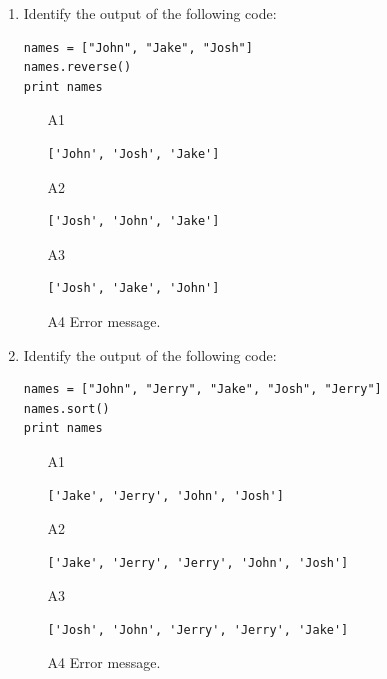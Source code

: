 \begin{enumerate}
\begin{enumerate}
\begin{verbatim}
['Jenny', 'John', 'Jake', 'Josh']
\end{verbatim}
\item[A2] 
\begin{verbatim}
['John', 'Jenny', 'Jake', 'Josh']
\end{verbatim}
\item[A3] 
\begin{verbatim}
['Jenny', 'Jake', 'Josh']
\end{verbatim}
\item[A4] Error message.
\end{enumerate}
\item Identify the output of the following code:
\begin{verbatim}
names = ["John", "Jake", "Josh"]
names.reverse()
print names
\end{verbatim}
\begin{enumerate}
\item[A1] 
\begin{verbatim}
['John', 'Josh', 'Jake']
\end{verbatim}
\item[A2] 
\begin{verbatim}
['Josh', 'John', 'Jake']
\end{verbatim}
\item[A3] 
\begin{verbatim}
['Josh', 'Jake', 'John']
\end{verbatim}
\item[A4] Error message.
\end{enumerate}
\item Identify the output of the following code:
\begin{verbatim}
names = ["John", "Jerry", "Jake", "Josh", "Jerry"]
names.sort()
print names
\end{verbatim}
\begin{enumerate}
\item[A1] 
\begin{verbatim}
['Jake', 'Jerry', 'John', 'Josh']
\end{verbatim}
\item[A2] 
\begin{verbatim}
['Jake', 'Jerry', 'Jerry', 'John', 'Josh']
\end{verbatim}
\item[A3] 
\begin{verbatim}
['Josh', 'John', 'Jerry', 'Jerry', 'Jake']
\end{verbatim}
\item[A4] Error message.

\end{enumerate}
\end{enumerate}
